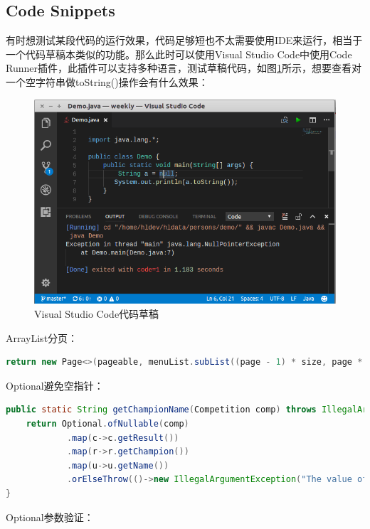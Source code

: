 \documentclass[letter]{book}
\begin{document}
\subsection{Code Snippets}

有时想测试某段代码的运行效果，代码足够短也不太需要使用IDE来运行，相当于一个代码草稿本类似的功能。那么此时可以使用Visual Studio Code中使用Code Runner插件，此插件可以支持多种语言，测试草稿代码，如图\ref{fig:visualstudiocodesnippet}所示，想要查看对一个空字符串做toString()操作会有什么效果：

\begin{figure}[htbp]
	\centering
	\includegraphics[scale=0.5]{visualstudiocodesnippet.png}
	\caption{Visual Studio Code代码草稿}
	\label{fig:visualstudiocodesnippet}
\end{figure}

ArrayList分页：

\begin{lstlisting}[language=Java]
return new Page<>(pageable, menuList.subList((page - 1) * size, page * size));
\end{lstlisting}

Optional避免空指针：

\begin{lstlisting}[language=Java]
public static String getChampionName(Competition comp) throws IllegalArgumentException {
	return Optional.ofNullable(comp)
			.map(c->c.getResult())
			.map(r->r.getChampion())
			.map(u->u.getName())
			.orElseThrow(()->new IllegalArgumentException("The value of param comp isn't available."));
}
\end{lstlisting}

Optional参数验证：
\end{document}
